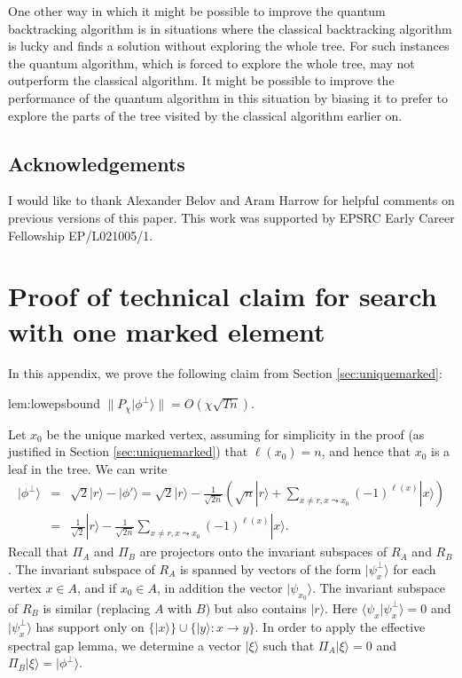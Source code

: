 \documentclass[11pt]{article}
\newcommand{\ket}[1]{| #1 \rangle}
\newcommand{\ip}[2]{\langle #1|#2 \rangle}
\newcommand{\beas}{\begin{eqnarray*}}
\newcommand{\eeas}{\end{eqnarray*}}
\begin{document}
%
One other way in which it might be possible to improve the quantum backtracking algorithm is in situations where the classical backtracking algorithm is lucky and finds a solution without exploring the whole tree. For such instances the quantum algorithm, which is forced to explore the whole tree, may not outperform the classical algorithm. It might be possible to improve the performance of the quantum algorithm in this situation by biasing it to prefer to explore the parts of the tree visited by the classical algorithm earlier on.


\subsection*{Acknowledgements}

I would like to thank Alexander Belov and Aram Harrow for helpful comments on previous versions of this paper. This work was supported by EPSRC Early Career Fellowship EP/L021005/1.


\appendix

\section{Proof of technical claim for search with one marked element}
\label{app:lowepsbound}

In this appendix, we prove the following claim from Section \ref{sec:uniquemarked}:

\begin{replem}{lem:lowepsbound}
$\|P_\chi \ket{\phi^\perp} \| = O(\chi \sqrt{Tn})$.
\end{replem}

Let $x_0$ be the unique marked vertex, assuming for simplicity in the proof (as justified in Section \ref{sec:uniquemarked}) that $\ell(x_0)=n$, and hence that $x_0$ is a leaf in the tree. We can write
%
\beas \ket{\phi^\perp} &=& \sqrt{2} \ket{r} - \ket{\phi'} = \sqrt{2} \ket{r} - \frac{1}{\sqrt{2n}} \left( \sqrt{n} \ket{r} + \sum_{x \neq r, x \leadsto x_0} (-1)^{\ell(x)} \ket{x} \right)\\
&=& \frac{1}{\sqrt{2}} \ket{r} - \frac{1}{\sqrt{2n}} \sum_{x \neq r, x \leadsto x_0} (-1)^{\ell(x)} \ket{x}. %
\eeas
%
Recall that $\Pi_A$ and $\Pi_B$ are projectors onto the invariant subspaces of $R_A$ and $R_B$. The invariant subspace of $R_A$ is spanned by vectors of the form $\ket{\psi_x^\perp}$ for each vertex $x \in A$, and if $x_0 \in A$, in addition the vector $\ket{\psi_{x_0}}$. The invariant subspace of $R_B$ is similar (replacing $A$ with $B$) but also contains $\ket{r}$. Here $\ip{\psi_x}{\psi_x^\perp} = 0$ and $\ket{\psi_x^\perp}$ has support only on $\{\ket{x}\} \cup \{ \ket{y}: x \rightarrow y \}$. In order to apply the effective spectral gap lemma, we determine a vector $\ket{\xi}$ such that $\Pi_A \ket{\xi} = 0$ and $\Pi_B \ket{\xi} = \ket{\phi^\perp}$.
\end{document}
